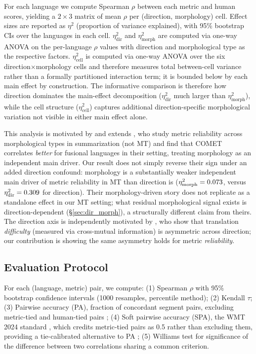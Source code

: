 \documentclass[11pt]{article}
\begin{document}
For each language we compute Spearman $\rho$ between each metric and human scores, yielding a $2{\times}3$ matrix of mean $\rho$ per (direction, morphology) cell. Effect sizes are reported as $\eta^2$ (proportion of variance explained), with 95\% bootstrap CIs over the languages in each cell. $\eta^2_{\text{dir}}$ and $\eta^2_{\text{morph}}$ are computed via one-way ANOVA on the per-language $\rho$ values with direction and morphological type as the respective factors. $\eta^2_{\text{cell}}$ is computed via one-way ANOVA over the six direction$\times$morphology cells and therefore measures total between-cell variance rather than a formally partitioned interaction term; it is bounded below by each main effect by construction. The informative comparison is therefore how direction dominates the main-effect decomposition ($\eta^2_{\text{dir}}$ much larger than $\eta^2_{\text{morph}}$), while the cell structure ($\eta^2_{\text{cell}}$) captures additional direction-specific morphological variation not visible in either main effect alone.

This analysis is motivated by and extends \citet{mondshine2025ngrams}, who study metric reliability across morphological types in summarization (not MT) and find that COMET correlates \emph{better} for fusional languages in their setting, treating morphology as an independent main driver. Our result does not simply reverse their sign under an added direction confound: morphology is a substantially weaker independent main driver of metric reliability in MT than direction is ($\eta^2_{\text{morph}}=0.073$, versus $\eta^2_{\text{dir}}=0.309$ for direction). Their morphology-driven story does not replicate as a standalone effect in our MT setting; what residual morphological signal exists is direction-dependent (\S\ref{sec:dir_morph}), a structurally different claim from theirs. The direction axis is independently motivated by \citet{bugliarello2020xmi}, who show that translation \emph{difficulty} (measured via cross-mutual information) is asymmetric across direction; our contribution is showing the same asymmetry holds for metric \emph{reliability}.

\subsection{Evaluation Protocol}

For each (language, metric) pair, we compute:
(1) Spearman $\rho$ with 95\% bootstrap confidence intervals (1000 resamples, percentile method);
(2) Kendall $\tau$;
(3) Pairwise accuracy (PA), fraction of concordant segment pairs, excluding metric-tied and human-tied pairs \cite{freitag2023results};
(4) Soft pairwise accuracy (SPA), the WMT 2024 standard \cite{thompson2024spa}, which credits metric-tied pairs as 0.5 rather than excluding them, providing a tie-calibrated alternative to PA \cite{deutsch2023ties};
(5) Williams \citeyearpar{williams1959} test for significance of the difference between two correlations sharing a common criterion.
\end{document}
